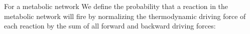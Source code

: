 For a metabolic network
We define the probability that a reaction in the metabolic network will fire by normalizing the thermodynamic driving force of each reaction by the sum of all forward and backward driving forces: